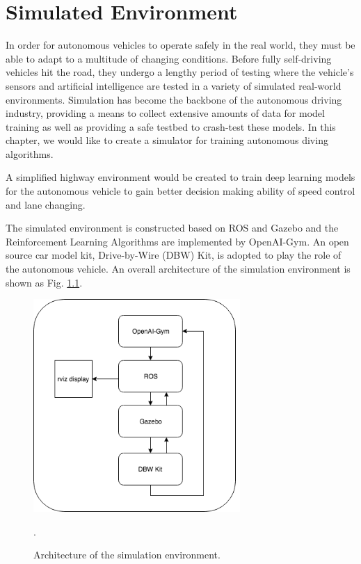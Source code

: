 \chapter{Simulated Environment} 

% 

In order for autonomous vehicles to operate safely in the real world, they must be able to adapt to a multitude of changing conditions. Before fully self-driving vehicles hit the road, they undergo a lengthy period of testing where the vehicle's sensors and artificial intelligence are tested in a variety of simulated real-world environments. Simulation has become the backbone of the autonomous driving industry, providing a means to collect extensive amounts of data for model training as well as providing a safe testbed to crash-test these models. In this chapter, we would like to create a simulator for training autonomous diving algorithms.

A simplified highway environment would be created to train deep learning models for the autonomous vehicle to gain better decision making ability of speed control and  lane changing.

The simulated environment is constructed based on ROS and Gazebo and the Reinforcement Learning Algorithms are implemented by OpenAI-Gym. An open source car model kit, Drive-by-Wire (DBW) Kit, is adopted to play the role of the autonomous vehicle. An overall architecture of the simulation environment is shown as Fig. \ref{fig:sim-env}.

\begin{figure}[h]
\centering
\includegraphics[width=0.7\textwidth]{figs/ch2/simulation-architecture}
\caption{Architecture of the simulation environment.}
\label{fig:sim-env}.
\end{figure}

